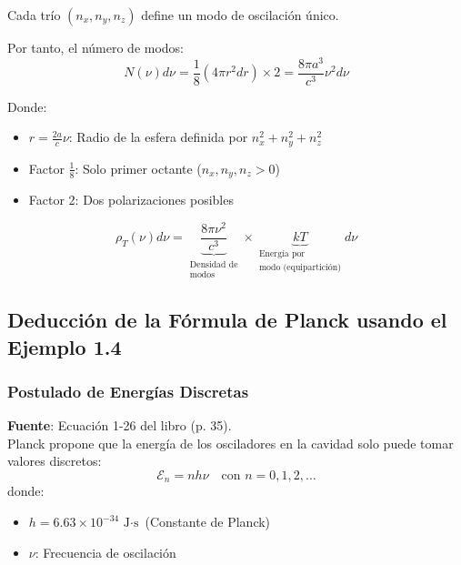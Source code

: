 \documentclass{article}
\begin{document}
	Cada trío \((n_x,n_y,n_z)\) define un modo de oscilación único.
	

	Por tanto, el número de modos:
	\begin{equation}
		N(\nu)d\nu = \frac{1}{8}(4\pi r^2 dr) \times 2 = \frac{8\pi a^3}{c^3}\nu^2 d\nu
	\end{equation}
	
	Donde:
	\begin{itemize}
		\item \(r = \frac{2a}{c}\nu\): Radio de la esfera definida por $n_x^2 + n_y^2 + n_z^2$
		\item Factor \(\frac{1}{8}\): Solo primer octante (\(n_x,n_y,n_z > 0\))
		\item Factor 2: Dos polarizaciones posibles
	\end{itemize}
	
	\begin{equation}
		\rho_T(\nu)d\nu = \underbrace{\frac{8\pi\nu^2}{c^3}}_{\substack{\text{Densidad de} \\ \text{modos}}} \times \underbrace{kT}_{\substack{\text{Energía por} \\ \text{modo (equipartición)}}} d\nu
	\end{equation}
	
	\subsection{Deducción de la Fórmula de Planck usando el Ejemplo 1.4}
	
	\subsubsection*{Postulado de Energías Discretas}
	\textbf{Fuente}: Ecuación 1-26 del libro (p. 35).\\
	Planck propone que la energía de los osciladores en la cavidad solo puede tomar valores discretos:
	\begin{equation}
		\mathcal{E}_n = nh\nu \quad \text{con } n = 0,1,2,\ldots
	\end{equation}
	donde:
	\begin{itemize}
		\item \(h = 6.63 \times 10^{-34}\, \text{J$\cdot$s}\) (Constante de Planck)
		\item \(\nu\): Frecuencia de oscilación
	\end{itemize}
	
\end{document}
